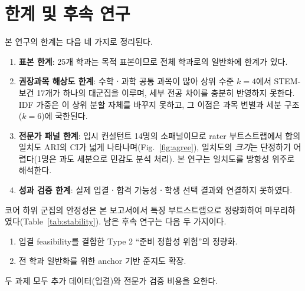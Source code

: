 \documentclass[conference]{IEEEtran}
\begin{document}
\section{한계 및 후속 연구}

본 연구의 한계는 다음 네 가지로 정리된다.
\begin{enumerate}
\item \textbf{표본 한계}: 25개 학과는 목적 표본이므로 전체 학과로의 일반화에 한계가 있다.
\item \textbf{권장과목 해상도 한계}: 수학ㆍ과학 공통 과목이 많아 상위 수준 $k=4$에서 STEM-보건 17개가 하나의 대군집을 이루며, 세부 전공 차이를 충분히 반영하지 못한다. IDF 가중은 이 상위 분할 자체를 바꾸지 못하고, 그 이점은 과목 변별과 세분 구조($k=6$)에 국한된다.
\item \textbf{전문가 패널 한계}: 입시 컨설턴트 14명의 소패널이므로 rater 부트스트랩에서 합의 일치도 ARI의 CI가 넓게 나타나며(Fig.~\ref{fig:agree}), 일치도의 \emph{크기}는 단정하기 어렵다(1명은 과도 세분으로 민감도 분석 처리). 본 연구는 일치도를 방향성 위주로 해석한다.
\item \textbf{성과 검증 한계}: 실제 입결ㆍ합격 가능성ㆍ학생 선택 결과와 연결하지 못하였다.
\end{enumerate}

코어 하위 군집의 안정성은 본 보고서에서 특징 부트스트랩으로 정량화하여 마무리하였다(Table~\ref{tab:stability}). 남은 후속 연구는 다음 두 가지이다.
\begin{enumerate}
\item 입결 feasibility를 결합한 Type 2 ``준비 정합성 위험''의 정량화.
\item 전 학과 일반화를 위한 anchor 기반 준지도 확장.
\end{enumerate}
두 과제 모두 추가 데이터(입결)와 전문가 검증 비용을 요한다.
\end{document}
